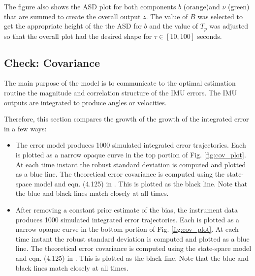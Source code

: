 \documentclass[letter,twocolumn]{article}
\begin{document}
The figure also shows the ASD plot for both components $b$ (orange)and $\nu$ (green) that are summed to create the overall output $z$. The value of $B$ was selected to get the appropriate height of the the ASD for $b$ and the value of $T_p$ was adjusted so that the overall plot had the desired shape for $\tau\in[10,100]$ seconds.

\subsection{Check: Covariance}
The main purpose of the model is to communicate to the optimal estimation routine the magnitude and correlation structure of the IMU errors. The IMU outputs are integrated to produce angles or velocities. 

Therefore, this section compares the growth of the growth of the integrated error in a few ways:
\begin{itemize}
	\item The error model produces 1000 simulated integrated error trajectories. 
	Each is plotted as a narrow opaque curve in the top portion of Fig. \ref{fig:cov_plot}. 
	At each time instant the robust standard deviation is computed and plotted as a blue line.
	The theoretical error covariance is computed using the state-space model and eqn. (4.125) in \cite{farrell2008aided}. 
	This is plotted as the black line. 
	Note that the blue and black lines match closely at all times.
	\item 	After removing a constant prior estimate of the bias, the instrument data produces 1000 simulated integrated error trajectories. 
	Each is plotted as a narrow opaque curve in the bottom portion of Fig. \ref{fig:cov_plot}. 
	At each time instant the robust standard deviation is computed and plotted as a blue line.
	The theoretical error covariance is computed using the state-space model and eqn. (4.125) in \cite{farrell2008aided}. 
	This is plotted as the black line. 
	Note that the blue and black lines match closely at all times.
\end{itemize}




\end{document}
